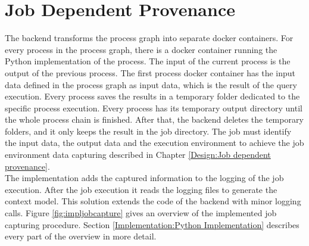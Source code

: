 \documentclass[draft,final]{vutinfth} %
\begin{document}
\section{Job Dependent Provenance}\label{Implementation:Job dependent provenance}
The backend transforms the process graph into separate docker containers. For every process in the process graph, there is a docker container running the Python implementation of the process. The input of the current process is the output of the previous process. The first process docker container has the input data defined in the process graph as input data, which is the result of the query execution. Every process saves the results in a temporary folder dedicated to the specific process execution. Every process has its temporary output directory until the whole process chain is finished. After that, the backend deletes the temporary folders, and it only keeps the result in the job directory.
The job must identify the input data, the output data and the execution environment to achieve the job environment data capturing described in Chapter \ref{Design:Job dependent provenance}. \\ 
The implementation adds the captured information to the logging of the job execution. After the job execution it reads the logging files to generate the context model. This solution extends the code of the backend with minor logging calls. Figure \ref{fig:impljobcapture} gives an overview of the implemented job capturing procedure. Section \ref{Implementation:Python Implementation} describes every part of the overview in more detail.
\end{document}
